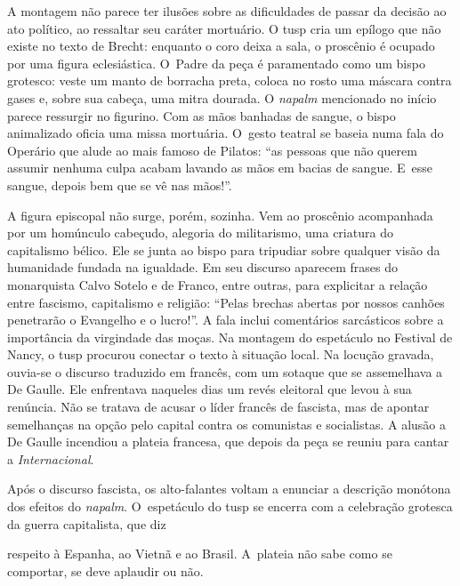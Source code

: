A montagem não parece ter ilusões sobre as dificuldades de passar da
decisão ao ato político, ao ressaltar seu caráter mortuário. O {\sc tusp} cria
um epílogo que não existe no texto de Brecht: enquanto o coro deixa a
sala, o proscênio é ocupado por uma figura eclesiástica. O~Padre da peça
é paramentado como um bispo grotesco: veste um manto de borracha preta,
coloca no rosto uma máscara contra gases e, sobre sua cabeça, uma mitra
dourada. O {\it napalm} mencionado no início parece ressurgir no
figurino. Com as mãos banhadas de sangue, o bispo animalizado oficia uma
missa mortuária. O~gesto teatral se baseia numa fala do Operário que
alude ao mais famoso de Pilatos: “as pessoas que não querem assumir
nenhuma culpa acabam lavando as mãos em bacias de sangue. E~esse sangue,
depois bem que se vê nas mãos!”.

A figura episcopal não surge, porém, sozinha. Vem ao proscênio
acompanhada por um homúnculo cabeçudo, alegoria do militarismo, uma
criatura do capitalismo bélico. Ele se junta ao bispo para tripudiar
sobre qualquer visão da humanidade fundada na igualdade. Em seu discurso
aparecem frases do monarquista Calvo Sotelo e de Franco, entre outras,
para explicitar a relação entre fascismo, capitalismo e religião: “Pelas
brechas abertas por nossos canhões penetrarão o Evangelho e o lucro!”. A
fala inclui comentários sarcásticos sobre a importância da virgindade
das moças. Na montagem do espetáculo no Festival de Nancy, o {\sc tusp}
procurou conectar o texto à situação local. Na locução gravada, ouvia-se
o discurso traduzido em francês, com um sotaque que se assemelhava a De
Gaulle. Ele enfrentava naqueles dias um revés eleitoral que levou à sua
renúncia. Não se tratava de acusar o líder francês de fascista, mas de apontar
semelhanças na opção pelo capital contra os comunistas e socialistas. A
alusão a De Gaulle incendiou a plateia francesa, que depois da peça
se reuniu para cantar a {\it Internacional}.

Após o discurso fascista, os alto-falantes voltam a enunciar a descrição
monótona dos efeitos do {\it napalm}. O~espetáculo do {\sc tusp} se encerra
com a celebração grotesca da guerra capitalista, que diz

\column
\noindent{}respeito à
Espanha, ao Vietnã e ao Brasil. A~plateia não sabe como se comportar, se
deve aplaudir ou não.


